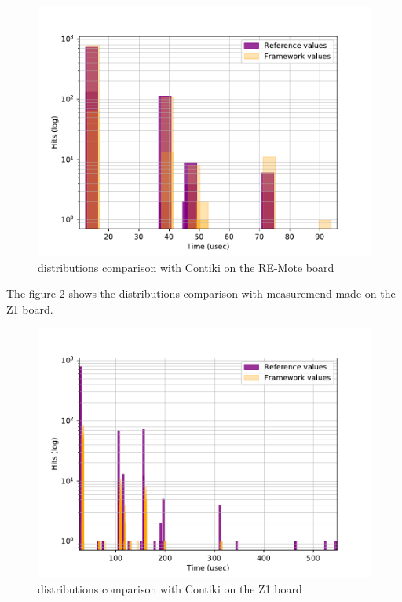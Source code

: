 \begin{figure}[!ht]
  \centering
  \includegraphics[scale=.7]{assets/comparison-devices-framework-contiki-remote.pdf}
  \caption{distributions comparison with Contiki on the RE-Mote board\label{fig:comparison-devices-framework-contiki-remote}}
\end{figure}

The figure \ref{fig:comparison-devices-framework-contiki-z1} shows the distributions comparison with measuremend made on the Z1 board.

\begin{figure}[!ht]
  \centering
  \includegraphics[scale=.7]{assets/comparison-devices-framework-contiki-z1.pdf}
  \caption{distributions comparison with Contiki on the Z1 board\label{fig:comparison-devices-framework-contiki-z1}}
\end{figure}

